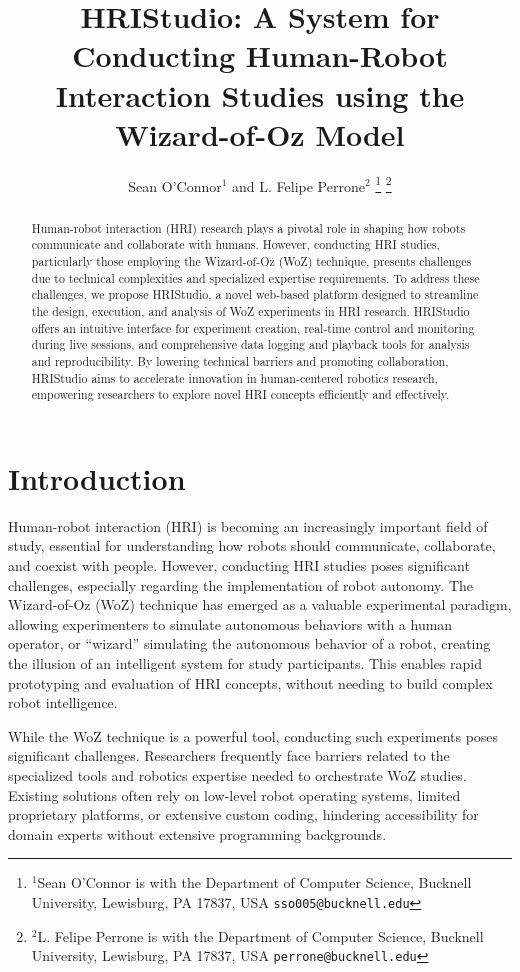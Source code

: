 \documentclass[letterpaper, 10 pt, conference]{ieeeconf}
\title{\LARGE \bf HRIStudio: A System for Conducting Human-Robot Interaction Studies using the Wizard-of-Oz Model}
\author{Sean O'Connor$^{1}$ and L. Felipe Perrone$^{2}$%
    \thanks{$^{1}$Sean O'Connor is with the Department of Computer Science,
        Bucknell University, Lewisburg, PA 17837, USA
            {\tt\small sso005@bucknell.edu}}%
    \thanks{$^{2}$L. Felipe Perrone is with the Department of Computer Science,
        Bucknell University, Lewisburg, PA 17837, USA
            {\tt\small perrone@bucknell.edu}}%
}
\begin{document}
\maketitle
\thispagestyle{empty}
\pagestyle{empty}


\begin{abstract}

Human-robot interaction (HRI) research plays a pivotal role in shaping how robots communicate and collaborate with humans. However, conducting HRI studies, particularly those employing the Wizard-of-Oz (WoZ) technique, presents challenges due to technical complexities and specialized expertise requirements. To address these challenges, we propose HRIStudio, a novel web-based platform designed to streamline the design, execution, and analysis of WoZ experiments in HRI research. HRIStudio offers an intuitive interface for experiment creation, real-time control and monitoring during live sessions, and comprehensive data logging and playback tools for analysis and reproducibility. By lowering technical barriers and promoting collaboration, HRIStudio aims to accelerate innovation in human-centered robotics research, empowering researchers to explore novel HRI concepts efficiently and effectively.

\end{abstract}




\section{Introduction}

Human-robot interaction (HRI) is becoming an increasingly important field of study, essential for understanding how robots should communicate, collaborate, and coexist with people. However, conducting HRI studies poses significant challenges, especially regarding the implementation of robot autonomy. The Wizard-of-Oz (WoZ) technique has emerged as a valuable experimental paradigm, allowing experimenters to simulate autonomous behaviors with a human operator, or ``wizard'' simulating the autonomous behavior of a robot, creating the illusion of an intelligent system for study participants. This enables rapid prototyping and evaluation of HRI concepts, without needing to build complex robot intelligence.

While the WoZ technique is a powerful tool, conducting such experiments poses significant challenges. Researchers frequently face barriers related to the specialized tools and robotics expertise needed to orchestrate WoZ studies. Existing solutions often rely on low-level robot operating systems, limited proprietary platforms, or extensive custom coding, hindering accessibility for domain experts without extensive programming backgrounds.
\end{document}
